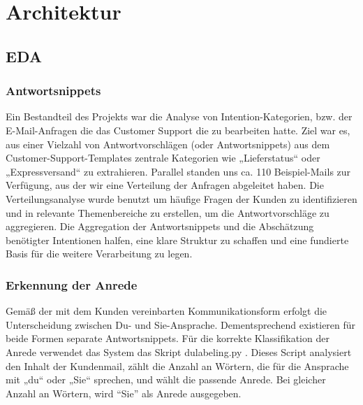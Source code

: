 \chapter{Architektur}


\section{EDA}

\subsection{Antwortsnippets}


Ein  Bestandteil des Projekts war die Analyse von Intention-Kategorien, bzw. der E-Mail-Anfragen 
die das Customer Support die zu bearbeiten hatte. Ziel war es, aus einer Vielzahl von Antwortvorschlägen 
(oder Antwortsnippets) aus dem Customer-Support-Templates zentrale Kategorien wie „Lieferstatus“ oder 
„Expressversand“ zu extrahieren. Parallel standen uns ca. 110 Beispiel-Mails zur Verfügung, aus der wir 
eine Verteilung der Anfragen abgeleitet haben. Die Verteilungsanalyse wurde benutzt um häufige Fragen 
der Kunden zu identifizieren und in relevante Themenbereiche zu erstellen, um die Antwortvorschläge zu 
aggregieren. Die Aggregation der Antwortsnippets und die Abschätzung benötigter Intentionen halfen, 
eine klare Struktur zu schaffen und eine fundierte Basis für die weitere Verarbeitung zu legen.

\subsection{Erkennung der Anrede}

Gemäß der mit dem Kunden vereinbarten Kommunikationsform erfolgt die Unterscheidung
zwischen Du- und Sie-Ansprache. Dementsprechend existieren für beide Formen separate
Antwortsnippets. Für die korrekte Klassifikation der Anrede verwendet das System das
Skript du\textunderscore labeling.py . Dieses Script analysiert den Inhalt der Kundenmail,
zählt die Anzahl an Wörtern, die für die Ansprache mit „du“ oder „Sie“ sprechen, und wählt
die passende Anrede. Bei gleicher Anzahl an Wörtern, wird “Sie” als Anrede ausgegeben. 

